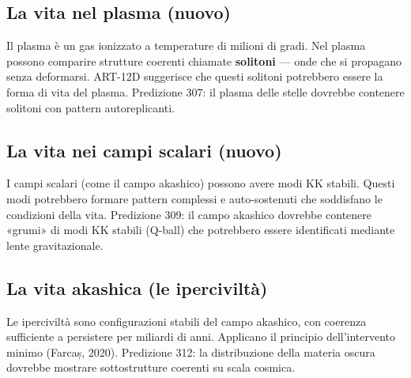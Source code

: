 \subsection{La vita nel plasma (nuovo)}
Il plasma è un gas ionizzato a temperature di milioni di gradi. Nel plasma possono comparire strutture coerenti chiamate \textbf{solitoni} --- onde che si propagano senza deformarsi. ART-12D suggerisce che questi solitoni potrebbero essere la forma di vita del plasma. Predizione 307: il plasma delle stelle dovrebbe contenere solitoni con pattern autoreplicanti.

\subsection{La vita nei campi scalari (nuovo)}
I campi scalari (come il campo akashico) possono avere modi KK stabili. Questi modi potrebbero formare pattern complessi e auto-sostenuti che soddisfano le condizioni della vita. Predizione 309: il campo akashico dovrebbe contenere «grumi» di modi KK stabili (Q-ball) che potrebbero essere identificati mediante lente gravitazionale.

\subsection{La vita akashica (le iperciviltà)}
Le iperciviltà sono configurazioni stabili del campo akashico, con coerenza sufficiente a persistere per miliardi di anni. Applicano il principio dell'intervento minimo (Farcaș, 2020). Predizione 312: la distribuzione della materia oscura dovrebbe mostrare sottostrutture coerenti su scala cosmica.

\newpage
